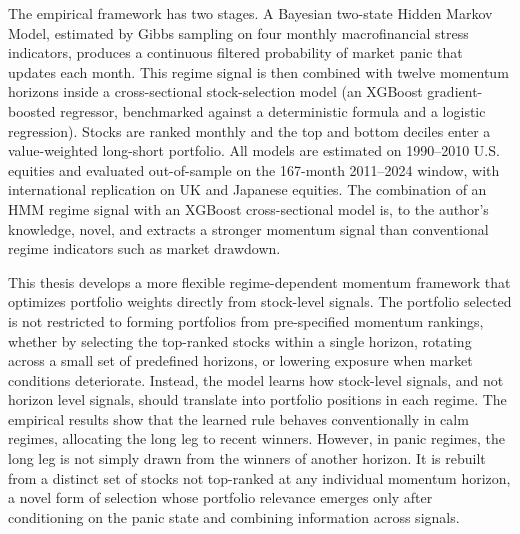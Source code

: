 \documentclass[12pt, a4paper]{article}
\begin{document}
The empirical framework has two stages. A Bayesian two-state Hidden Markov Model, estimated by Gibbs sampling on four monthly macrofinancial stress indicators, produces a continuous filtered probability of market panic that updates each month. This regime signal is then combined with twelve momentum horizons inside a cross-sectional stock-selection model (an XGBoost gradient-boosted regressor, benchmarked against a deterministic formula and a logistic regression).  Stocks are ranked monthly and the top and bottom deciles enter a value-weighted long-short portfolio. All models are estimated on 1990--2010 U.S. equities and evaluated out-of-sample on the 167-month 2011--2024 window, with international replication on UK and Japanese equities. The combination of an HMM regime signal with an XGBoost cross-sectional model is, to the author's knowledge, novel, and extracts a stronger momentum signal than conventional regime indicators such as market drawdown.

This thesis develops a more flexible regime-dependent momentum framework that optimizes portfolio weights directly from stock-level signals. The portfolio selected is not restricted to forming portfolios from pre-specified momentum rankings, whether by selecting the top-ranked stocks within a single horizon, rotating across a small set of predefined horizons, or lowering exposure when market conditions deteriorate. Instead, the model learns how stock-level signals, and not horizon level signals, should translate into portfolio positions in each regime. The empirical results show that the learned rule behaves conventionally in calm regimes, allocating the long leg to recent winners. However, in panic regimes, the long leg is not simply drawn from the winners of another horizon. It is rebuilt from a distinct set of stocks not top-ranked at any individual momentum horizon, a novel form of selection whose portfolio relevance emerges only after conditioning on the panic state and combining information across signals.

\newpage
\tableofcontents
\newpage








\newpage



\newpage
\appendix
\renewcommand{\thesection}{\Alph{section}}
\titleformat{\section}{\normalfont\Large\bfseries}{Appendix~\thesection:}{0.5em}{}

\end{document}
